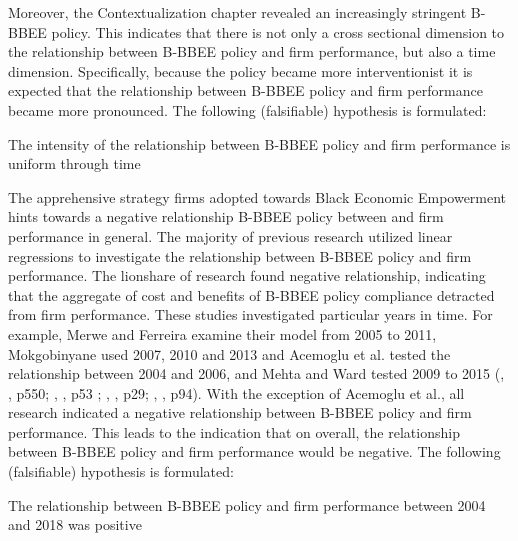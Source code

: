 Moreover, the Contextualization chapter revealed an increasingly stringent B-BBEE policy. This indicates that there is not only a cross sectional dimension to the relationship between B-BBEE policy and firm performance, but also a time dimension. Specifically, because the policy became more interventionist it is expected that the relationship between B-BBEE policy and firm performance became more pronounced. The following (falsifiable) hypothesis is formulated:
\begin{nullhypothesis}The intensity of the relationship between B-BBEE policy and firm performance is uniform through time\end{nullhypothesis}

The apprehensive strategy firms adopted towards Black Economic Empowerment hints towards a negative relationship B-BBEE policy between and firm performance in general. The majority of previous research utilized linear regressions to investigate the relationship between B-BBEE policy and firm performance.  The lionshare of research found negative relationship, indicating that the aggregate of cost and benefits of B-BBEE policy compliance detracted from firm performance. These studies investigated particular years in time. For example, Merwe and Ferreira examine their model from 2005 to 2011, Mokgobinyane used 2007, 2010 and 2013 and Acemoglu et al. tested the relationship between 2004 and 2006, and Mehta and Ward tested 2009 to 2015 (\citeauthor{N7}, \citeyear{N7}, p550; \citeauthor{N4}, \citeyear{N4}, p53 ; \citeauthor{N23}, \citeyear{N23}, p29; \citeauthor{N27}, \citeyear{N27}, p94). With the exception of Acemoglu et al., all research indicated a negative relationship between B-BBEE policy and firm performance. This leads to the indication that on overall, the relationship between B-BBEE policy and firm performance would be negative. The following (falsifiable) hypothesis is formulated:
\begin{nullhypothesis}The relationship between B-BBEE policy and firm performance between 2004 and 2018 was positive\end{nullhypothesis}
